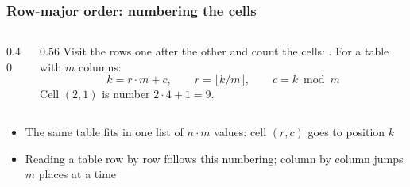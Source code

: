 \documentclass[aspectratio=169,10pt,compress]{beamer}
\begin{document}
\begin{frame}[t,fragile] \frametitle{Row-major order: numbering the cells}
	\begin{columns}[T]
		\begin{column}{0.40\textwidth}
			\begin{center}
			\end{center}
		\end{column}
		\begin{column}{0.56\textwidth}
			Visit the rows one after the other and count the cells: .
			For a table with $m$ columns:
			\[
				k = r \cdot m + c, \qquad r = \lfloor k / m \rfloor, \qquad c = k \bmod m
			\]
			Cell $(2, 1)$ is number $2 \cdot 4 + 1 = 9$.
		\end{column}
	\end{columns}

	\vspace{0.8em}
	\begin{itemize}\small
		\item The same table fits in one list of $n \cdot m$ values: cell $(r, c)$ goes to position $k$
		\item Reading a table row by row follows this numbering; column by column jumps $m$ places at a time
	\end{itemize}
\end{frame}




\end{document}
